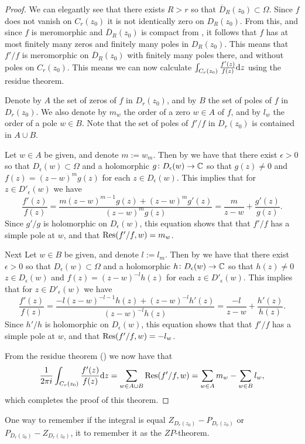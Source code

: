 \documentclass[11pt,a4paper]{article}
\begin{document}
\begin{proof}
  We can elegantly see that there exists $R > r$ so that
  $\overline D_R(z_0) \subset \Omega$.
  Since $f$ does not vanish on $C_r(z_0)$ it is not identically zero
  on $D_R(z_0)$.
  From this, and since $f$ is meromorphic and $\overline D_R(z_0)$ is
  compact from ,
  it follows that $f$ has at most finitely many zeros and finitely
  many poles in $D_R(z_0)$.
  This means that $f'/f$ is meromorphic on $\overline D_R(z_0)$ with finitely
  many poles there, and without poles on $C_r(z_0)$.
  This means we can now calculate $\int_{C_r(z_0)} \frac{f'(z)}{f(z)} \mathrm{d} z$
  using the residue theorem.

  Denote by $A$ the set of zeros of $f$ in $D_r(z_0)$,
  and by $B$ the set of poles of $f$ in $D_r(z_0)$.
  We also denote by $m_w$ the order of a zero $w \in A$ of $f$,
  and by $l_w$ the order of a pole $w \in B$.
  Note that the set of poles of $f'/f$ in $D_r(z_0)$ is contained in $A \cup B$.

  Let $w \in A$ be given, and denote $m := w_m$.
  Then by  we have that there exist
  $\epsilon > 0$ so that $D_{\epsilon}(w) \subset \Omega$ and a
  holomorphic $g \colon D_{\epsilon}(w) \to \mathbb{C}$ so that $g(z) \neq 0$ and
  $f(z) = (z - w)^m g(z)$ for each $z \in D_{\epsilon}(w)$.
  This implies that for $z \in D'_{\epsilon}(w)$ we have
  \[
    \frac{f'(z)}{f(z)} =
    \frac{m (z - w)^{m-1} g(z) + (z - w)^{m} g'(z)}{(z - w)^{m} g(z)} =
    \frac{m}{z - w} + \frac{g'(z)}{g(z)}.
  \]
  Since $g'/g$ is holomorphic on $D_{\epsilon}(w)$,
  this equation shows that that $f'/f$ has a simple pole at $w$,
  and that $\operatorname{Res}(f'/f,w) = m_w$.

  Next Let $w \in B$ be given, and denote $l := l_m$.
  Then by  we have that there exist
  $\epsilon > 0$ so that $D_{\epsilon}(w) \subset \Omega$ and a
  holomorphic $h \colon D_{\epsilon}(w) \to \mathbb{C}$ so that $h(z) \neq 0$
  $z \in D_{\epsilon}(w)$ and $f(z) = (z - w)^{-l} h(z)$ for each
  $z \in D'_{\epsilon}(w)$.
  This implies that for $z \in D'_{\epsilon}(w)$ we have
  \[
    \frac{f'(z)}{f(z)} =
    \frac{-l (z - w)^{-l-1} h(z) + (z - w)^{-l} h'(z)}{(z - w)^{-l} h(z)} =
    \frac{-l}{z - w} + \frac{h'(z)}{h(z)}.
  \]
  Since $h'/h$ is holomorphic on $D_{\epsilon}(w)$,
  this equation shows that that $f'/f$ has a simple pole at $w$,
  and that $\operatorname{Res}(f'/f,w) = -l_w$.

  From the residue theorem () we now have
  that
  \[
    \frac{1}{2 \pi i} \int_{C_r(z_0)} \frac{f'(z)}{f(z)} \mathrm{d} z =
    \sum_{w \in A \cup B} \operatorname{Res}(f'/f,w) =
    \sum_{w \in A} m_w - \sum_{w \in B} l_w,
  \]
  which completes the proof of this theorem.
  \end{proof}
\begin{remark}
  One way to remember if the integral is equal $Z_{D_r(z_0)} - P_{D_r(z_0)}$
  or $P_{D_r(z_0)} - Z_{D_r(z_0)}$, it to remember it as the $ZP$-theorem.
\end{remark}
\end{document}
